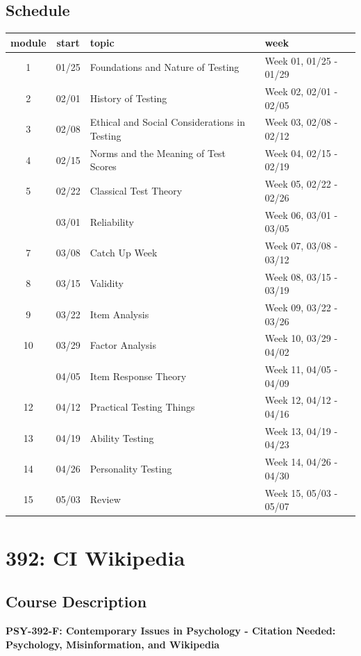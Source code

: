 \documentclass[
]{book}
\begin{document}
\section*{Schedule}\label{schedule-2}


\begin{longtable}{ccp{3in}l}
\toprule
module & start & topic & week\\
\midrule
1 & 01/25 & Foundations and Nature of Testing & Week 01, 01/25 - 01/29\\
2 & 02/01 & History of Testing & Week 02, 02/01 - 02/05\\
3 & 02/08 & Ethical and Social Considerations in Testing & Week 03, 02/08 - 02/12\\
4 & 02/15 & Norms and the Meaning of Test Scores & Week 04, 02/15 - 02/19\\
5 & 02/22 & Classical Test Theory & Week 05, 02/22 - 02/26\\
\addlinespace
6 & 03/01 & Reliability & Week 06, 03/01 - 03/05\\
7 & 03/08 & Catch Up Week & Week 07, 03/08 - 03/12\\
8 & 03/15 & Validity & Week 08, 03/15 - 03/19\\
9 & 03/22 & Item Analysis & Week 09, 03/22 - 03/26\\
10 & 03/29 & Factor Analysis & Week 10, 03/29 - 04/02\\
\addlinespace
11 & 04/05 & Item Response Theory & Week 11, 04/05 - 04/09\\
12 & 04/12 & Practical Testing Things & Week 12, 04/12 - 04/16\\
13 & 04/19 & Ability Testing & Week 13, 04/19 - 04/23\\
14 & 04/26 & Personality Testing & Week 14, 04/26 - 04/30\\
15 & 05/03 & Review & Week 15, 05/03 - 05/07\\
\bottomrule
\end{longtable}

\chapter*{392: CI Wikipedia}\label{wikipedia}


\section*{Course Description}\label{course-description-4}


\textbf{PSY-392-F: Contemporary Issues in Psychology - Citation Needed: Psychology, Misinformation, and Wikipedia}
\end{document}

